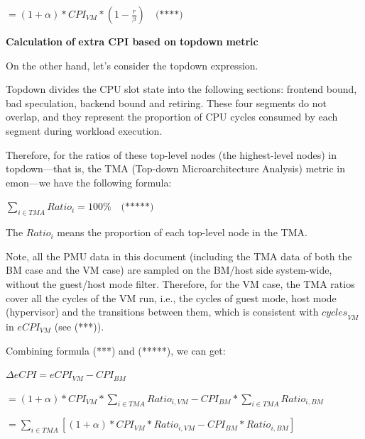 \documentclass[12pt]{article}
\newcommand{\npar}[1]{#1\par}
\newcommand{\dmath}[1]{{\centering $\displaystyle #1$\par}}
\newcommand{\emptypar}{\mbox{}\par}
\newcommand{\numpara}[4]{{\hangindent=#1\relax\hangafter=1\relax
  \noindent\hspace*{\dimexpr#1-#2\relax}\makebox[#2][l]{#3}#4\par}}
\begin{document}
\dmath{=\left( 1+\alpha  \right)*\mathit{CP}{\mathit{I}}_{\mathit{VM}}*\left( 1-\frac{\mathit{r}}{\beta } \right)\quad\text{(****)}}
\emptypar
\emptypar
\numpara{18.00pt}{18.00pt}{\textbf{(2)}}{\textbf{Calculation }\textbf{of }\textbf{extra CPI based on }\textbf{topdown}\textbf{ }\textbf{metric}}
\npar{\hspace*{4\fontdimen2\font}On the other hand, let’s consider the topdown expression.}
\npar{\hspace*{4\fontdimen2\font}Topdown divides the CPU slot state into the following sections: frontend bound, bad speculation, backend bound and retiring. These four segments do not overlap, and they represent the proportion of CPU cycles consumed by each segment during workload execution.}
\npar{\hspace*{4\fontdimen2\font}Therefore, for the ratios of these top-level nodes (the highest-level nodes) in topdown—that is, the TMA (Top-down Microarchitecture Analysis) metric in emon—we have the following formula:}
\dmath{\sum\limits_{\mathit{i}\in \mathit{TMA}}{\mathit{Rati}{\mathit{o}}_{\mathit{i}}}=100\%\quad\text{(*****)}}
\npar{\hspace*{9.60pt}The $\mathit{Rati}{\mathit{o}}_{\mathit{i}}$ means the proportion of each top-level node in the TMA.}
\npar{\hspace*{9.60pt}Note, all the PMU data in this document (including the TMA data of both the BM case and the VM case) are sampled on the BM/host side system-wide, without the guest/host mode filter. Therefore, for the VM case, the TMA ratios cover all the cycles of the VM run, i.e., the cycles of guest mode, host mode (hypervisor) and the transitions between them, which is consistent with ${\mathit{cycles}}_{\mathit{VM}}$ in ${\mathit{eCPI}}_{\mathit{VM}}$ (see (***)).}
\npar{\hspace*{4\fontdimen2\font}Combining formula (***) and (*****), we can get:}
\dmath{\Delta \mathit{eCPI}=\mathit{eCP}{\mathit{I}}_{\mathit{VM}}-\mathit{CP}{\mathit{I}}_{\mathit{BM}}}
\dmath{=\left( 1+\alpha  \right)*\mathit{CP}{\mathit{I}}_{\mathit{VM}}*\sum\limits_{\mathit{i}\in \mathit{TMA}}{\mathit{Rati}{\mathit{o}}_{\mathit{i},\mathit{VM}}}-\mathit{CP}{\mathit{I}}_{\mathit{BM}}*\sum\limits_{\mathit{i}\in \mathit{TMA}}{\mathit{Rati}{\mathit{o}}_{\mathit{i},\mathit{BM}}}}
\dmath{=\sum\limits_{\mathit{i}\in \mathit{TMA}}{\left[ \left( 1+\alpha  \right)*\mathit{CP}{\mathit{I}}_{\mathit{VM}}*\mathit{Rati}{\mathit{o}}_{\mathit{i},\mathit{VM}}-\mathit{CP}{\mathit{I}}_{\mathit{BM}}*\mathit{Rati}{\mathit{o}}_{\mathit{i},\mathit{BM}} \right]}}
\end{document}
